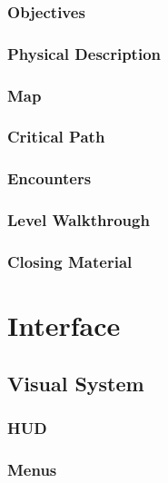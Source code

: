 \documentclass[12pt,titlepage]{article}
\begin{document}
\subsubsection{Objectives}

\subsubsection{Physical Description}

\subsubsection{Map}

\subsubsection{Critical Path}

\subsubsection{Encounters}

\subsubsection{Level Walkthrough}

\subsubsection{Closing Material}


\newpage
\section{Interface}

\subsection{Visual System}

\subsubsection{HUD}

\subsubsection{Menus}
\end{document}

